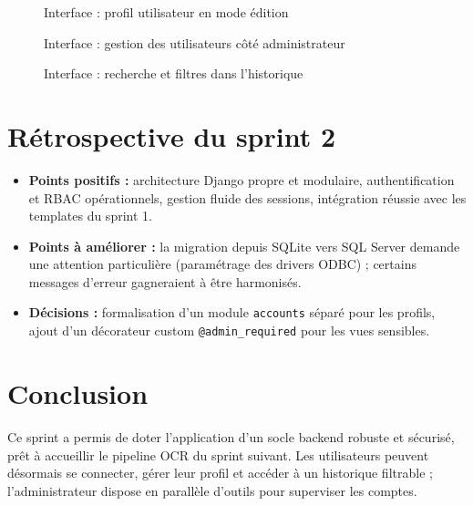 \begin{figure}[h!]
\centering
{}
\caption{Interface : profil utilisateur en mode édition}
\end{figure}

\begin{figure}[h!]
\centering
{}
\caption{Interface : gestion des utilisateurs côté administrateur}
\end{figure}

\begin{figure}[h!]
\centering
{}
\caption{Interface : recherche et filtres dans l'historique}
\end{figure}

\section{Rétrospective du sprint 2}
\begin{itemize}
\item \textbf{Points positifs :} architecture Django propre et modulaire,
authentification et RBAC opérationnels, gestion fluide des sessions, intégration
réussie avec les templates du sprint 1.
\item \textbf{Points à améliorer :} la migration depuis SQLite vers SQL Server demande
une attention particulière (paramétrage des drivers ODBC) ; certains messages d'erreur
gagneraient à être harmonisés.
\item \textbf{Décisions :} formalisation d'un module \texttt{accounts} séparé pour les
profils, ajout d'un décorateur custom \texttt{@admin\_required} pour les vues
sensibles.
\end{itemize}

\section*{Conclusion}
Ce sprint a permis de doter l'application d'un socle backend robuste et sécurisé,
prêt à accueillir le pipeline OCR du sprint suivant. Les utilisateurs peuvent
désormais se connecter, gérer leur profil et accéder à un historique filtrable ;
l'administrateur dispose en parallèle d'outils pour superviser les comptes.


